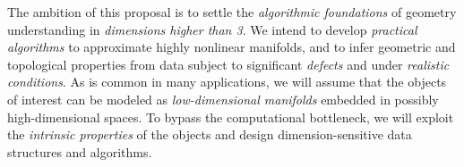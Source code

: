 \documentclass[a4paper, 11pt]{article}
\begin{document}

The ambition of this proposal is to settle the {\em algorithmic
foundations} of geometry understanding in 
{\em dimensions higher than 3}.  We intend to develop {\em practical algorithms} to approximate
highly nonlinear manifolds, and to infer geometric and topological
properties from data subject to significant {\em defects} and under
{\em realistic conditions}. 
%
As is common in many applications, we will assume that  the objects of
interest can be modeled as {\em low-dimensional manifolds} 
embedded in possibly high-dimensional spaces.
To  bypass the computational bottleneck, we will 
exploit the {\em intrinsic properties} of the objects and design
dimension-sensitive data structures and algorithms.%
\end{document}
